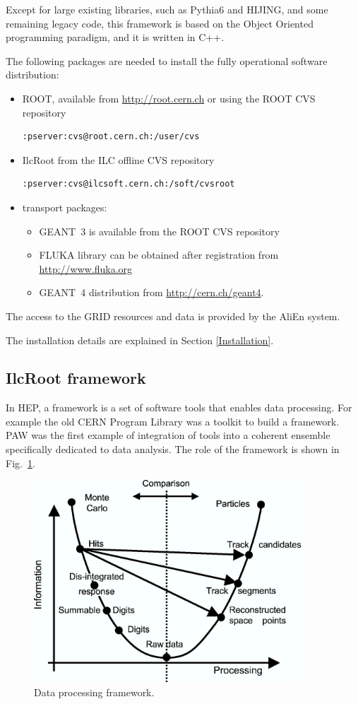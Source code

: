 \documentclass[12pt,a4paper,twoside]{article}
\begin{document}
Except for large existing libraries, such as Pythia6\cite{MC:PYTH} and
HIJING\cite{MC:HIJING}, and some remaining legacy code, this framework
is  based on  the  Object  Oriented programming  paradigm,  and it  is
written in C++.

The following packages are needed to install the fully operational
software distribution: 
\begin{itemize}
\item ROOT, available from \url{http://root.cern.ch}
or using the ROOT CVS repository
\begin{verbatim}
:pserver:cvs@root.cern.ch:/user/cvs
\end{verbatim}
\item IlcRoot from the ILC offline CVS repository 
\begin{verbatim}
:pserver:cvs@ilcsoft.cern.ch:/soft/cvsroot
\end{verbatim}
\item transport packages:
\begin{itemize}
\item GEANT~3 is available from the ROOT CVS repository
\item  FLUKA library can
be obtained after registration from \url{http://www.fluka.org}
\item GEANT~4 distribution from \url{http://cern.ch/geant4}.
\end{itemize}
\end{itemize}

The access to the GRID resources and data is provided by the
AliEn\cite{AliEn} system.

The installation details are explained in Section \ref{Installation}.

\subsection{IlcRoot framework}\label{IlcRootFramework}

In HEP, a framework is a set of software tools that enables data
processing. For example the old CERN Program Library was a toolkit to
build a framework. PAW was the first example of integration of tools
into a coherent ensemble specifically dedicated to data analysis. The
role of the framework is shown in Fig.~\ref{MC:Parab}.

\begin{figure}[ht]
  \centering
  \includegraphics[width=10cm]{picts/Parab}
  \caption{Data processing framework.} \label{MC:Parab}
\end{figure}
\end{document}
